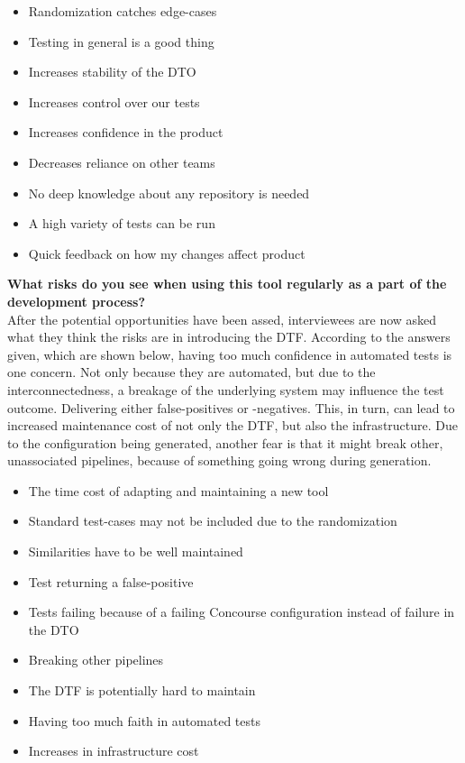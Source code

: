 \begin{itemize}
    \item Randomization catches edge-cases
    \item Testing in general is a good thing
    \item Increases stability of the DTO
    \item Increases control over our tests
    \item Increases confidence in the product
    \item Decreases reliance on other teams
    \item No deep knowledge about any repository is needed
    \item A high variety of tests can be run
    \item Quick feedback on how my changes affect product
\end{itemize}

\textbf{What risks do you see when using this tool regularly as a part of the development process?}\\
After the potential opportunities have been assed, interviewees are now asked what they think the risks are in introducing the DTF.
According to the answers given, which are shown below, having too much confidence in automated tests is one concern.
Not only because they are automated, but due to the interconnectedness, a breakage of the underlying system may influence the test outcome.
Delivering either false-positives or -negatives.
This, in turn, can lead to increased maintenance cost of not only the DTF, but also the infrastructure.
Due to the configuration being generated, another fear is that it might break other, unassociated pipelines, because of something going wrong during generation.

\begin{itemize}
    \item The time cost of adapting and maintaining a new tool
    \item Standard test-cases may not be included due to the randomization
    \item Similarities have to be well maintained
    \item Test returning a false-positive
    \item Tests failing because of a failing Concourse configuration instead of failure in the DTO
    \item Breaking other pipelines
    \item The DTF is potentially hard to maintain
    \item Having too much faith in automated tests
    \item Increases in infrastructure cost
\end{itemize}
